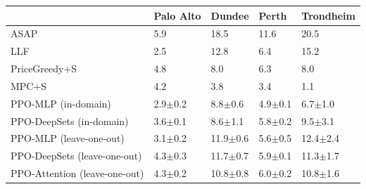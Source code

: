 \begin{tabular}{lllll}
\toprule
 & Palo Alto & Dundee & Perth & Trondheim \\
\midrule
ASAP & 5.9 & 18.5 & 11.6 & 20.5 \\
LLF & 2.5 & 12.8 & 6.4 & 15.2 \\
PriceGreedy+S & 4.8 & 8.0 & 6.3 & 8.0 \\
MPC+S & 4.2 & 3.8 & 3.4 & 1.1 \\
PPO-MLP (in-domain) & 2.9$\pm$0.2 & 8.8$\pm$0.6 & 4.9$\pm$0.1 & 6.7$\pm$1.0 \\
PPO-DeepSets (in-domain) & 3.6$\pm$0.1 & 8.6$\pm$1.1 & 5.8$\pm$0.2 & 9.5$\pm$3.1 \\
PPO-MLP (leave-one-out) & 3.1$\pm$0.2 & 11.9$\pm$0.6 & 5.6$\pm$0.5 & 12.4$\pm$2.4 \\
PPO-DeepSets (leave-one-out) & 4.3$\pm$0.3 & 11.7$\pm$0.7 & 5.9$\pm$0.1 & 11.3$\pm$1.7 \\
PPO-Attention (leave-one-out) & 4.3$\pm$0.2 & 10.8$\pm$0.8 & 6.0$\pm$0.2 & 10.8$\pm$1.6 \\
\bottomrule
\end{tabular}
